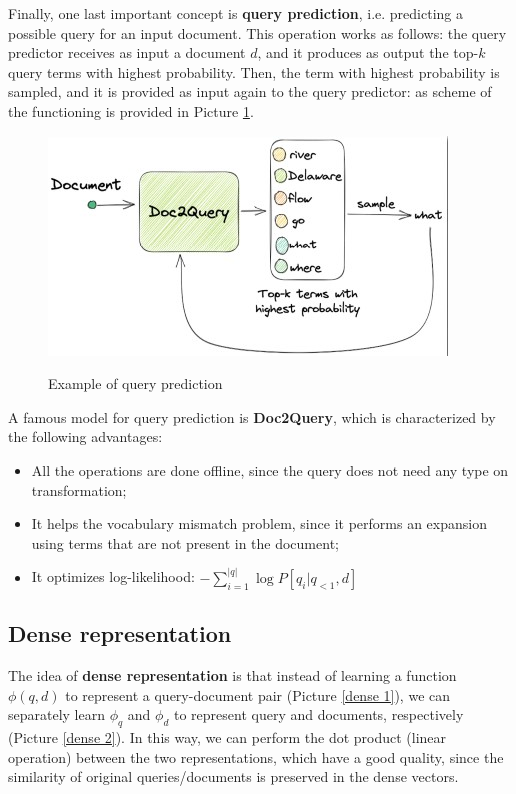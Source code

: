 Finally, one last important concept is \textbf{query prediction}, i.e. predicting a possible query for an input document. This operation works as follows: the query predictor receives as input a document $d$, and it produces as output the top-$k$ query terms with highest probability. Then, the term with highest probability is sampled, and it is provided as input again to the query predictor: as scheme of the functioning is provided in Picture \ref{query pred}.

\begin{figure}[h!]
		\centering
		\includegraphics[scale = 1.8]{img/query prediction.jpg}
        \label{query pred}
        \caption{Example of query prediction}
\end{figure}

A famous model for query prediction is \textbf{Doc2Query}, which is characterized by the following advantages:

\begin{itemize}
    \item All the operations are done offline, since the query does not need any type on transformation;
    \item It helps the vocabulary mismatch problem, since it performs an expansion using terms that are not present in the document;
    \item It optimizes log-likelihood: $- \sum_{i = 1}^{|q|} \log P[q_i | q_{<1}, d]$
\end{itemize}

\subsection{Dense representation}\label{dense}
The idea of \textbf{dense representation} is that instead of learning a function $\phi(q,d)$ to represent a query-document pair (Picture \ref{dense 1}), we can separately learn $\phi_q$ and $\phi_d$ to represent query and documents, respectively (Picture \ref{dense 2}). In this way, we can perform the dot product (linear operation) between the two representations, which have a good quality, since the similarity of original queries/documents is preserved in the dense vectors.


